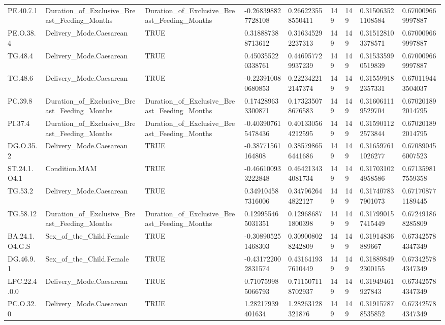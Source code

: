 \begin{longtable}{lllllllll}
PE.40.7.1 & Duration\_of\_Exclusive\_Breast\_Feeding\_Months & Duration\_of\_Exclusive\_Breast\_Feeding\_Months & -0.268398827728108 & 0.266223558550411 & 149 & 149 & 0.315063521108584 & 0.670009669997887 \\
PE.O.38.4 & Delivery\_Mode.Caesarean & TRUE & 0.318887388713612 & 0.316345292237313 & 149 & 149 & 0.315128103378571 & 0.670009669997887 \\
TG.48.4 & Delivery\_Mode.Caesarean & TRUE & 0.450355220338761 & 0.446957729937239 & 149 & 149 & 0.315335990519839 & 0.670009669997887 \\
TG.48.6 & Delivery\_Mode.Caesarean & TRUE & -0.223910080680853 & 0.222342212147374 & 149 & 149 & 0.315599182357331 & 0.670119443504037 \\
PC.39.8 & Duration\_of\_Exclusive\_Breast\_Feeding\_Months & Duration\_of\_Exclusive\_Breast\_Feeding\_Months & 0.174289633300871 & 0.173235078676583 & 149 & 149 & 0.316061119529704 & 0.670201892014795 \\
PI.37.4 & Duration\_of\_Exclusive\_Breast\_Feeding\_Months & Duration\_of\_Exclusive\_Breast\_Feeding\_Months & -0.403907615478436 & 0.401330564212595 & 149 & 149 & 0.315901122573844 & 0.670201892014795 \\
DG.O.35.2 & Delivery\_Mode.Caesarean & TRUE & -0.38771561164808 & 0.385798656441686 & 149 & 149 & 0.316597611026277 & 0.670890456007523 \\
ST.24.1.O4.1 & Condition.MAM & TRUE & -0.466100933222848 & 0.464213434081734 & 149 & 149 & 0.317031024958586 & 0.671359817559358 \\
TG.53.2 & Delivery\_Mode.Caesarean & TRUE & 0.349104587316006 & 0.347962644822127 & 149 & 149 & 0.317407837901073 & 0.671708771189445 \\
TG.58.12 & Duration\_of\_Exclusive\_Breast\_Feeding\_Months & Duration\_of\_Exclusive\_Breast\_Feeding\_Months & 0.129955465031351 & 0.129686871800398 & 149 & 149 & 0.317990157415449 & 0.672491868285809 \\
BA.24.1.O4.G.S & Sex\_of\_the\_Child.Female & TRUE & -0.308905251468303 & 0.309008028242809 & 149 & 149 & 0.31914836889667 & 0.673425784347349 \\
DG.46.9.1 & Sex\_of\_the\_Child.Female & TRUE & -0.431722002831574 & 0.431641937610449 & 149 & 149 & 0.318898492300155 & 0.673425784347349 \\
LPC.22.4.0.0 & Delivery\_Mode.Caesarean & TRUE & 0.710759985066793 & 0.711507118702937 & 149 & 149 & 0.31949461927843 & 0.673425784347349 \\
PC.O.32.0 & Delivery\_Mode.Caesarean & TRUE & 1.28217939401634 & 1.28263128321876 & 149 & 149 & 0.319157878535852 & 0.673425784347349 \\

\end{longtable}
